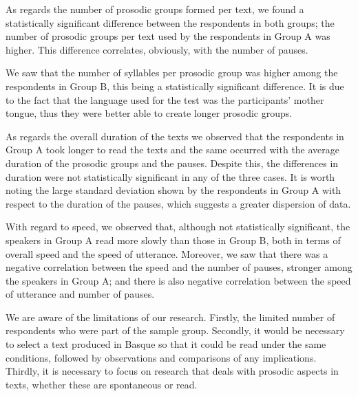 \documentclass[output=paper]{langsci/langscibook}
\begin{document}
  As regards the number of prosodic groups formed per text, we found a statistically significant difference between the respondents in both groups; the number of prosodic groups per text used by the respondents in Group A was higher. This difference correlates, obviously, with the number of pauses.

  We saw that the number of syllables per prosodic group was higher among the respondents in Group B, this being a statistically significant difference. It is due to the fact that the language used for the test was the participants' mother tongue, thus they were better able to create longer prosodic groups.

  As regards the overall duration of the texts we observed that the respondents in Group A took longer to read the texts and the same occurred with the average duration of the prosodic groups and the pauses. Despite this, the differences in duration were not statistically significant in any of the three cases. It is worth noting the large standard deviation shown by the respondents in Group A with respect to the duration of the pauses, which suggests a greater dispersion of data.

 With regard to speed, we observed that, although not statistically significant, the speakers in Group A read more slowly than those in Group B, both in terms of overall speed and the speed of utterance. Moreover, we saw that there was a negative correlation between the speed and the number of pauses, stronger among the speakers in Group A; and there is also negative correlation between the speed of utterance and number of pauses.

  We are aware of the limitations of our research. Firstly, the limited number of respondents who were part of the sample group. Secondly, it would be necessary to select a text produced in Basque so that it could be read under the same conditions, followed by observations and comparisons of any implications. Thirdly, it is necessary to focus on research that deals with prosodic aspects in texts, whether these are spontaneous or read.


\printbibliography[heading=subbibliography,notkeyword=this]
\end{document}
